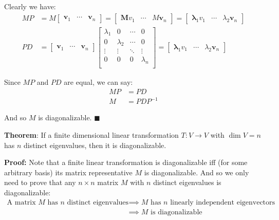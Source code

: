 \documentclass{article}
\renewcommand\vec{\mathbf}
\begin{document}
Clearly we have:
\begin{align*}
  MP&=M\begin{bmatrix}
    \vec v_1&\cdots&\vec v_n
  \end{bmatrix}
  =\begin{bmatrix}
    \vec Mv_1&\cdots&M\vec v_n
  \end{bmatrix}
  =\begin{bmatrix}
    \vec \lambda_1v_1&\cdots&\lambda_2\vec v_n
  \end{bmatrix}\tag{$\vec v_i$ are eigenvectors}\\
  PD&=\begin{bmatrix}
    \vec v_1&\cdots&\vec v_n
  \end{bmatrix}\begin{bmatrix}
    \lambda_1&0&\cdots&0\\
    0&\lambda_2&\cdots&0\\
    \vdots&\vdots&\ddots&\vdots\\
    0&0&0&\lambda_n\\
  \end{bmatrix}
  =\begin{bmatrix}
    \vec \lambda_1v_1&\cdots&\lambda_2\vec v_n
  \end{bmatrix}
\end{align*}

Since $MP$ and $PD$ are equal, we can say:
\begin{align*}
MP&=PD\\
M&=PDP^{-1}\tag{$P$ has linearly independent columns, thus is invertible}
\end{align*}

And so $M$ is diagonalizable. $\blacksquare$
\bigskip

\textbf{Theorem}: If a finite dimensional linear transformation $T:V\to V$ with $\operatorname{dim} V=n$ has $n$ distinct eigenvalues, then it is diagonalizable.
\medskip

\textbf{Proof:} Note that a finite linear transformation is diagonalizable iff (for some arbitrary basis) its matrix representative $M$ is diagonalizable. And so we only need to prove that any $n\times n$ matrix $M$ with $n$ distinct eigenvalues is diagonalizable:
\begin{align*}
  \text{A matrix $M$ has $n$ distinct eigenvalues}&\implies\text{$M$ has $n$ linearly independent eigenvectors}\tag{Lemma 1}\\
  &\implies\text{$M$ is diagonalizable}\tag{Lemma 2}
\end{align*}
\end{document}

